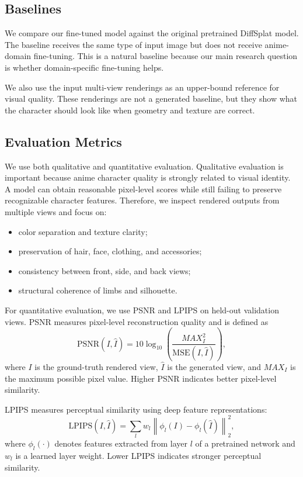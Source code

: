 \documentclass[10pt,twocolumn,letterpaper]{article}
\begin{document}
\subsection{Baselines}

We compare our fine-tuned model against the original pretrained DiffSplat model. The baseline receives the same type of input image but does not receive anime-domain fine-tuning. This is a natural baseline because our main research question is whether domain-specific fine-tuning helps.

We also use the input multi-view renderings as an upper-bound reference for visual quality. These renderings are not a generated baseline, but they show what the character should look like when geometry and texture are correct.

\subsection{Evaluation Metrics}

We use both qualitative and quantitative evaluation. Qualitative evaluation is important because anime character quality is strongly related to visual identity. A model can obtain reasonable pixel-level scores while still failing to preserve recognizable character features. Therefore, we inspect rendered outputs from multiple views and focus on:
\begin{itemize}
    \item color separation and texture clarity;
    \item preservation of hair, face, clothing, and accessories;
    \item consistency between front, side, and back views;
    \item structural coherence of limbs and silhouette.
\end{itemize}

For quantitative evaluation, we use PSNR and LPIPS on held-out validation views. 
PSNR measures pixel-level reconstruction quality and is defined as
\begin{equation}
\mathrm{PSNR}(I, \hat{I}) = 10 \log_{10} \left(\frac{MAX_I^2}{\mathrm{MSE}(I, \hat{I})}\right),
\end{equation}
where $I$ is the ground-truth rendered view, $\hat{I}$ is the generated view, and $MAX_I$ is the maximum possible pixel value. Higher PSNR indicates better pixel-level similarity.

LPIPS measures perceptual similarity using deep feature representations:
\begin{equation}
\mathrm{LPIPS}(I, \hat{I}) = \sum_l w_l \left\| \phi_l(I) - \phi_l(\hat{I}) \right\|_2^2,
\end{equation}
where $\phi_l(\cdot)$ denotes features extracted from layer $l$ of a pretrained network and $w_l$ is a learned layer weight. Lower LPIPS indicates stronger perceptual similarity.
\end{document}
